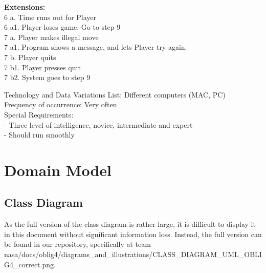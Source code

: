 \documentclass{article}
\begin{document}
\begin{flushleft}
\textbf{Extensions:}\\
6 a. Time runs out for Player\\
6 a1. Player loses game. Go to step 9\\
7 a. Player makes illegal move\\
7 a1. Program shows a message, and lets Player try again.\\
7 b. Player quits\\
7 b1. Player presses quit\\
7 b2. System goes to step 9\\
\vspace{3mm}

Technology and Data Variations List:\hspace{3mm} Different computers (MAC, PC)\\
Frequency of occurrence:\hspace{3mm} Very often\\
Special Requirements:\\
\hspace{5mm} - Three level of intelligence, novice, intermediate and expert\\
\hspace{5mm} - Should run smoothly\\
\vspace{10mm}

\newpage
\section{Domain Model}
\subsection{Class Diagram}
As the full version of the class diagram is rather large, it is difficult to display it in this document without significant information loss. Instead, the full version can be found in our repository, specifically at team-nasa/docs/oblig4/diagrams\_and\_illustrations/CLASS\_DIAGRAM\_UML\_OBLIG4\_correct.png.

	
\end{flushleft}
\end{document}

